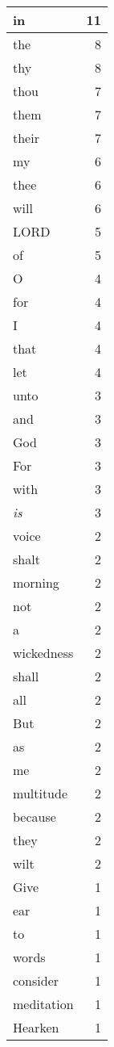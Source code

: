 \begin{center}
\begin{longtable}{l|r}
\hline \hline
\endlastfoot
in & 11 \\ \hline
the & 8 \\ \hline
thy & 8 \\ \hline
thou & 7 \\ \hline
them & 7 \\ \hline
their & 7 \\ \hline
my & 6 \\ \hline
thee & 6 \\ \hline
will & 6 \\ \hline
LORD & 5 \\ \hline
of & 5 \\ \hline
O & 4 \\ \hline
for & 4 \\ \hline
I & 4 \\ \hline
that & 4 \\ \hline
let & 4 \\ \hline
unto & 3 \\ \hline
and & 3 \\ \hline
God & 3 \\ \hline
For & 3 \\ \hline
with & 3 \\ \hline
\emph{is} & 3 \\ \hline
voice & 2 \\ \hline
shalt & 2 \\ \hline
morning & 2 \\ \hline
not & 2 \\ \hline
a & 2 \\ \hline
wickedness & 2 \\ \hline
shall & 2 \\ \hline
all & 2 \\ \hline
But & 2 \\ \hline
as & 2 \\ \hline
me & 2 \\ \hline
multitude & 2 \\ \hline
because & 2 \\ \hline
they & 2 \\ \hline
wilt & 2 \\ \hline
Give & 1 \\ \hline
ear & 1 \\ \hline
to & 1 \\ \hline
words & 1 \\ \hline
consider & 1 \\ \hline
meditation & 1 \\ \hline
Hearken & 1 \\ \hline

\end{longtable}
\end{center}
